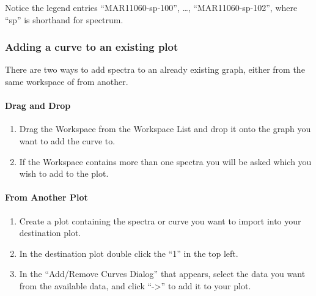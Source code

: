 \documentclass[letterpaper,10pt,english,openany]{sphinxmanual}
\begin{document}
Notice the legend entries “MAR11060-sp-100”, …, “MAR11060-sp-102”,
where “sp” is shorthand for spectrum.


\subsubsection{Adding a curve to an existing plot}
\label{\detokenize{mantid_basic_course/loading_and_displaying_data/03_displaying_1D_data:adding-a-curve-to-an-existing-plot}}
There are two ways to add spectra to an already existing graph, either
from the same workspace of from another.


\paragraph{Drag and Drop}
\label{\detokenize{mantid_basic_course/loading_and_displaying_data/03_displaying_1D_data:drag-and-drop}}\begin{enumerate}
\def\theenumi{\arabic{enumi}}
\def\labelenumi{\theenumi .}
\makeatletter\def\p@enumii{\p@enumi \theenumi .}\makeatother
\item {} 
Drag the Workspace from the Workspace List and drop it onto the graph
you want to add the curve to.

\item {} 
If the Workspace contains more than one spectra you will be asked
which you wish to add to the plot.

\end{enumerate}


\paragraph{From Another Plot}
\label{\detokenize{mantid_basic_course/loading_and_displaying_data/03_displaying_1D_data:from-another-plot}}\begin{enumerate}
\def\theenumi{\arabic{enumi}}
\def\labelenumi{\theenumi .}
\makeatletter\def\p@enumii{\p@enumi \theenumi .}\makeatother
\item {} 
Create a plot containing the spectra or curve you want to import into
your destination plot.

\item {} 
In the destination plot double click the “1” in the top left.

\item {} 
In the “Add/Remove Curves Dialog” that appears, select the data you
want from the available data, and click “-\textgreater{}” to add it to your plot.

\end{enumerate}
\end{document}
